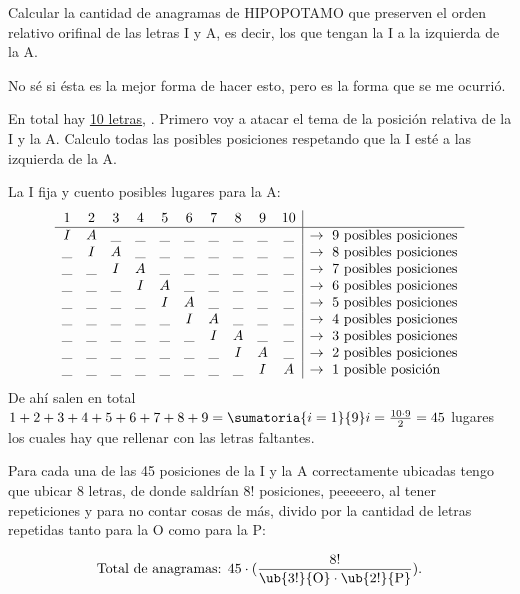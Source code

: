 \begin{enunciado}{\ejExtra}
	Calcular la cantidad de anagramas de HIPOPOTAMO que preserven el orden
	relativo orifinal de las letras I y A, es decir, los que tengan la I
	a la izquierda de la A.
\end{enunciado}

No sé si ésta es la mejor forma de hacer esto, pero es la forma que
se me ocurrió.\par
En total hay \underline{10 letras}, .
Primero voy a atacar el tema de la posición relativa de la I y la A.
Calculo todas las posibles posiciones respetando que la I esté a las izquierda de la A.\par
La I fija y cuento posibles lugares para la A:
$$
	\begin{array}{cccccccccc | l}
		1  & 2  & 3  & 4  & 5  & 6  & 7  & 8  & 9  & 10 &                                   \\ \hline
		I  & A  & \_ & \_ & \_ & \_ & \_ & \_ & \_ & \_ & \to \text{ 9 posibles posiciones} \\
		\_ & I  & A  & \_ & \_ & \_ & \_ & \_ & \_ & \_ & \to \text{ 8 posibles posiciones} \\
		\_ & \_ & I  & A  & \_ & \_ & \_ & \_ & \_ & \_ & \to \text{ 7 posibles posiciones} \\
		\_ & \_ & \_ & I  & A  & \_ & \_ & \_ & \_ & \_ & \to \text{ 6 posibles posiciones} \\
		\_ & \_ & \_ & \_ & I  & A  & \_ & \_ & \_ & \_ & \to \text{ 5 posibles posiciones} \\
		\_ & \_ & \_ & \_ & \_ & I  & A  & \_ & \_ & \_ & \to \text{ 4 posibles posiciones} \\
		\_ & \_ & \_ & \_ & \_ & \_ & I  & A  & \_ & \_ & \to \text{ 3 posibles posiciones} \\
		\_ & \_ & \_ & \_ & \_ & \_ & \_ & I  & A  & \_ & \to \text{ 2 posibles posiciones} \\
		\_ & \_ & \_ & \_ & \_ & \_ & \_ & \_ & I  & A  & \to \text{ 1 posible posición}
	\end{array}
$$
De ahí salen en total $1 + 2+3+4+5+6+7+8+9 = \sumatoria{i=1}{9} i = \frac{10 \cdot 9}{2} = 45$ lugares los cuales hay que
rellenar con las letras faltantes.\par
Para cada una de las 45 posiciones de la I y la A correctamente ubicadas tengo que ubicar 8 letras, de donde saldrían
$8!$ posiciones, peeeeero, al tener repeticiones y para no contar cosas de más, divido por la cantidad de letras repetidas tanto para la O como para la P:\par
$$
	\text{Total de anagramas: } 45 \cdot (\frac{8!}{\ub{3!}{\text{O}} \cdot \ub{2!}{\text{P}} }).
$$



